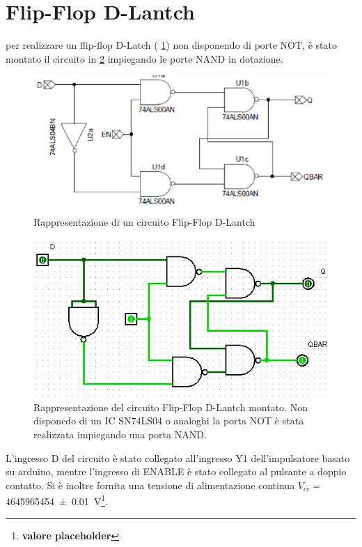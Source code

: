 \documentclass[a4paper,11pt]{article}
\newcommand{\p}{\footnote{\textbf{valore placeholder}}}
\begin{document}
\section{Flip-Flop D-Lantch}
	per realizzare un flip-flop D-Latch (\figurename{ \ref{f:D-Latch1}}) non disponendo di porte NOT, è stato montato il circuito in \figurename{ \ref{f:D-Latch2}} impiegando le 
	porte NAND in dotazione.
	\begin{figure}[hb]
		\centering
		\includegraphics[scale=0.75]{../Figs-Tabs/D-Latch1.png}
		\caption{Rappresentazione di un circuito Flip-Flop D-Lantch}
			\label{f:D-Latch1}
	\end{figure}
	
	\begin{figure}[htb]
		\centering
		\includegraphics[scale=0.75]{../Figs-Tabs/D-Latch2.png}
		\caption{Rappresentazione del circuito Flip-Flop D-Lantch montato.
		Non disponedo di un IC SN74LS04 o analoghi la porta NOT è stata realizzata impiegando una porta NAND.}
	\label{f:D-Latch2}
	\end{figure}
	L'ingresso D del circuito è stato collegato all'ingresso Y1 dell'impulsatore basato su arduino,
	mentre l'ingresso di ENABLE è stato collegato al pulsante a doppio contatto.
	Si è inoltre fornita una tensione di alimentazione continua $V_{cc}=$\SI{4645965454 \pm 0.01}{\volt}\p.
	
\end{document}
